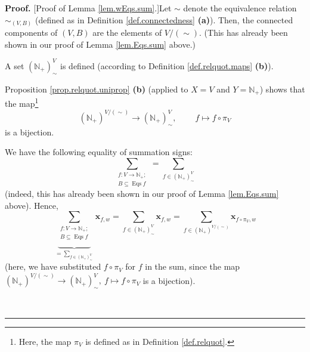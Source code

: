 \documentclass[numbers=enddot,12pt,final,onecolumn,notitlepage]{scrartcl}%
\theoremstyle{definition}
\newenvironment{proof}[1][Proof]{\noindent\textbf{#1.} }{\ \rule{0.5em}{0.5em}}
\newenvironment{verlong}{}{}
\let\sumnonlimits\sum
\renewcommand{\sum}{\sumnonlimits\limits}
\begin{document}
\begin{verlong}
\begin{proof}
[Proof of Lemma \ref{lem.wEqs.sum}.]Let $\sim$ denote the equivalence relation
$\sim_{\left(  V,B\right)  }$ (defined as in Definition
\ref{def.connectedness} \textbf{(a)}). Then, the connected components of
$\left(  V,B\right)  $ are the elements of $V/\left(  \sim\right)  $. (This
has already been shown in our proof of Lemma \ref{lem.Eqs.sum} above.)

A set $\left(  \mathbb{N}_{+}\right)  _{\sim}^{V}$ is defined (according to
Definition \ref{def.relquot.maps} \textbf{(b)}).

Proposition \ref{prop.relquot.uniprop} \textbf{(b)} (applied to $X=V$ and
$Y=\mathbb{N}_{+}$) shows that the map\footnote{Here, the map $\pi_{V}$ is
defined as in Definition \ref{def.relquot}.}%
\[
\left(  \mathbb{N}_{+}\right)  ^{V/\left(  \sim\right)  }\rightarrow\left(
\mathbb{N}_{+}\right)  _{\sim}^{V},\ \ \ \ \ \ \ \ \ \ f\mapsto f\circ\pi_{V}%
\]
is a bijection.

We have the following equality of summation signs:
\[
\sum_{\substack{f:V\rightarrow\mathbb{N}_{+};\\B\subseteq\operatorname*{Eqs}%
f}}=\sum_{f\in\left(  \mathbb{N}_{+}\right)  _{\sim}^{V}}%
\]
(indeed, this has already been shown in our proof of Lemma \ref{lem.Eqs.sum}
above). Hence,%
\begin{equation}
\underbrace{\sum_{\substack{f:V\rightarrow\mathbb{N}_{+};\\B\subseteq
\operatorname*{Eqs}f}}}_{=\sum_{f\in\left(  \mathbb{N}_{+}\right)  _{\sim}%
^{V}}}\mathbf{x}_{f,w}=\sum_{f\in\left(  \mathbb{N}_{+}\right)  _{\sim}^{V}%
}\mathbf{x}_{f,w}=\sum_{f\in\left(  \mathbb{N}_{+}\right)  ^{V/\left(
\sim\right)  }}\mathbf{x}_{f\circ\pi_{V},w} \label{pf.lem.wEqs.sum.1}%
\end{equation}
(here, we have substituted $f\circ\pi_{V}$ for $f$ in the sum, since the map
$\left(  \mathbb{N}_{+}\right)  ^{V/\left(  \sim\right)  }\rightarrow\left(
\mathbb{N}_{+}\right)  _{\sim}^{V},\ f\mapsto f\circ\pi_{V}$ is a bijection).


\end{proof}
\end{verlong}
\end{document}
